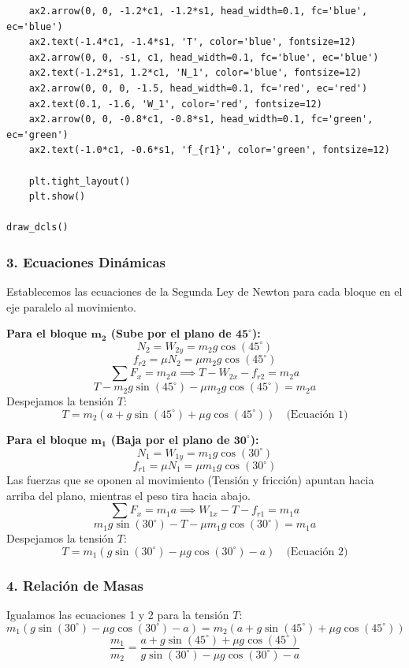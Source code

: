 \documentclass[12pt, a4paper]{article}
\begin{document}
\begin{lstlisting}
    ax2.arrow(0, 0, -1.2*c1, -1.2*s1, head_width=0.1, fc='blue', ec='blue')
    ax2.text(-1.4*c1, -1.4*s1, 'T', color='blue', fontsize=12)
    ax2.arrow(0, 0, -s1, c1, head_width=0.1, fc='blue', ec='blue')
    ax2.text(-1.2*s1, 1.2*c1, 'N_1', color='blue', fontsize=12)
    ax2.arrow(0, 0, 0, -1.5, head_width=0.1, fc='red', ec='red')
    ax2.text(0.1, -1.6, 'W_1', color='red', fontsize=12)
    ax2.arrow(0, 0, -0.8*c1, -0.8*s1, head_width=0.1, fc='green', ec='green')
    ax2.text(-1.0*c1, -0.6*s1, 'f_{r1}', color='green', fontsize=12)

    plt.tight_layout()
    plt.show()

draw_dcls()
\end{lstlisting}

\subsubsection*{3. Ecuaciones Dinámicas}
Establecemos las ecuaciones de la Segunda Ley de Newton para cada bloque en el eje paralelo al movimiento.

\textbf{Para el bloque $\mathbf{m_2}$ (Sube por el plano de $\mathbf{45^\circ}$):}
$$ N_2 = W_{2y} = m_2 g \cos(45^\circ) $$
$$ f_{r2} = \mu N_2 = \mu m_2 g \cos(45^\circ) $$
$$ \sum F_x = m_2 a \implies T - W_{2x} - f_{r2} = m_2 a $$
$$ T - m_2 g \sin(45^\circ) - \mu m_2 g \cos(45^\circ) = m_2 a $$
Despejamos la tensión $T$:
$$ T = m_2 (a + g \sin(45^\circ) + \mu g \cos(45^\circ)) \quad \text{(Ecuación 1)} $$

\textbf{Para el bloque $\mathbf{m_1}$ (Baja por el plano de $\mathbf{30^\circ}$):}
$$ N_1 = W_{1y} = m_1 g \cos(30^\circ) $$
$$ f_{r1} = \mu N_1 = \mu m_1 g \cos(30^\circ) $$
Las fuerzas que se oponen al movimiento (Tensión y fricción) apuntan hacia arriba del plano, mientras el peso tira hacia abajo.
$$ \sum F_x = m_1 a \implies W_{1x} - T - f_{r1} = m_1 a $$
$$ m_1 g \sin(30^\circ) - T - \mu m_1 g \cos(30^\circ) = m_1 a $$
Despejamos la tensión $T$:
$$ T = m_1 (g \sin(30^\circ) - \mu g \cos(30^\circ) - a) \quad \text{(Ecuación 2)} $$

\subsubsection*{4. Relación de Masas}
Igualamos las ecuaciones 1 y 2 para la tensión $T$:
$$ m_1 (g \sin(30^\circ) - \mu g \cos(30^\circ) - a) = m_2 (a + g \sin(45^\circ) + \mu g \cos(45^\circ)) $$
$$ \frac{m_1}{m_2} = \frac{a + g \sin(45^\circ) + \mu g \cos(45^\circ)}{g \sin(30^\circ) - \mu g \cos(30^\circ) - a} $$
\end{document}
